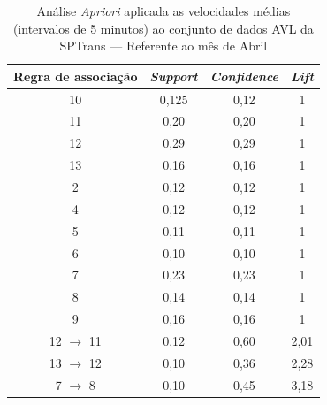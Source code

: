 \documentclass[
	12pt,				%
	oneside,			%
	a4paper,			%
	english,			%
	brazil				%
	]{abntex2ppgsi}
\begin{document}
{{{\begin{apendicesenv}
\begin{table}[!htb]
\centering
\caption {Análise \textit{Apriori} aplicada as velocidades médias (intervalos de 5 minutos) ao conjunto de dados AVL da SPTrans --- Referente ao mês de Abril}
\label {tab:aprioriApril}
\begin{tabular}{c|c|c|c}
\toprule
\textbf{Regra de associação} & \textit{\textbf{Support}} & \textit{\textbf{Confidence}} & \textit{\textbf{Lift}} \\
\midrule 
10 &  0,125 &  0,12 &  1\\
\hline
11 &  0,20 &  0,20 &  1\\
\hline
12 &  0,29 &  0,29 &  1\\
\hline
13 &  0,16 &  0,16 &  1\\
\hline
2 &  0,12 &  0,12 &  1\\
\hline
4 &  0,12 &  0,12 &  1\\
\hline
5 &  0,11 &  0,11 &  1\\
\hline
6 &  0,10 &  0,10 &  1\\
\hline
7 &  0,23 &  0,23 &  1\\
\hline
8 &  0,14 &  0,14 &  1\\
\hline
9 &  0,16 &  0,16 &  1\\
\hline
12  $\rightarrow$ 11 &  0,12 &  0,60 &  2,01\\
\hline
13  $\rightarrow$ 12 &  0,10 &  0,36&  2,28\\
\hline
7  $\rightarrow$ 8 &  0,10 &  0,45 &  3,18\\
\bottomrule
\end{tabular}
\end{table}


\end{apendicesenv}}}}
\end{document}
